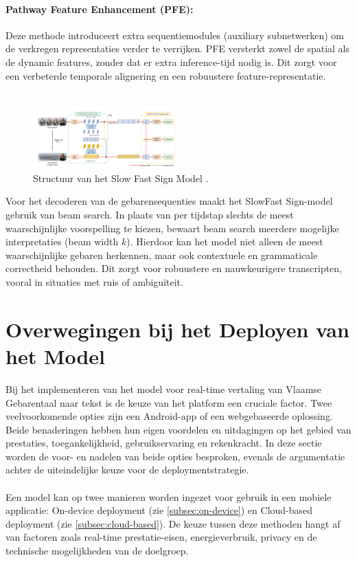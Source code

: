 \paragraph{Pathway Feature Enhancement (PFE):}
Deze methode introduceert extra sequentiemodules (auxiliary subnetwerken) om de verkregen representaties verder te verrijken. 
PFE versterkt zowel de spatial als de dynamic features, zonder dat er extra inference-tijd nodig is. 
Dit zorgt voor een verbeterde temporale alignering en een robuustere feature-representatie\autocite{10445841}.
\\
\\
\begin{figure}[h!]
  \includegraphics[width=0.5\textwidth]{../graphics/structuurSlowFast.png}
  \caption{Structuur van het Slow Fast Sign Model \autocite{10445841}.}
  \label{fig:structuur_slowFast}
\end{figure}

Voor het decoderen van de gebarensequenties maakt het SlowFast Sign-model gebruik van beam search. 
In plaats van per tijdstap slechts de meest waarschijnlijke voorspelling te kiezen, bewaart beam search meerdere mogelijke interpretaties (beam width $k$). 
Hierdoor kan het model niet alleen de meest waarschijnlijke gebaren herkennen, maar ook contextuele en grammaticale correctheid behouden. 
Dit zorgt voor robuustere en nauwkeurigere transcripten, vooral in situaties met ruis of ambiguïteit\autocite{10445841}.
\section{Overwegingen bij het Deployen van het Model}
Bij het implementeren van het model voor real-time vertaling van Vlaamse Gebarentaal naar tekst is de keuze van het platform een cruciale factor. 
Twee veelvoorkomende opties zijn een Android-app of een webgebaseerde oplossing. Beide benaderingen hebben hun eigen voordelen en uitdagingen op het gebied van prestaties, toegankelijkheid, gebruikservaring en rekenkracht. 
In deze sectie worden de voor- en nadelen van beide opties besproken, evenals de argumentatie achter de uiteindelijke keuze voor de deploymentstrategie.
\\
\\
Een model kan op twee manieren worden ingezet voor gebruik in een mobiele applicatie: On-device deployment (zie \ref{subsec:on-device}) en Cloud-based deployment (zie \ref{subsec:cloud-based}).
De keuze tussen deze methoden hangt af van factoren zoals real-time prestatie-eisen, energieverbruik, privacy en de technische mogelijkheden van de doelgroep.

